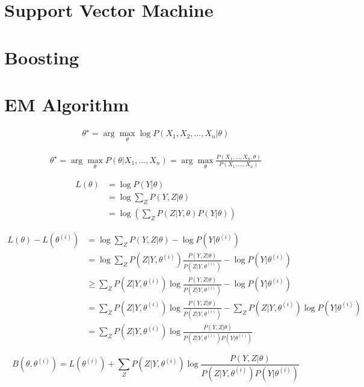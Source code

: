\documentclass[11pt]{article}
\begin{document}
\begin{CJK*}{UTF8}{gbsn}
\section{Support Vector Machine}

\section{Boosting}

\section{EM Algorithm}

\begin{align*}
	\theta^\star = \arg\max_{\theta}\log P(X_1,X_2,...,X_n|\theta)
\end{align*}

\begin{align*}
	\theta^\star = \arg\max_{\theta} P(\theta|X_1,...,X_n) = \arg\max_{\theta}\frac{P(X_1,...,X_n,\theta)}{P(X_1,...,X_n)}
\end{align*}

\begin{align*}
	L(\theta) &= \log P(Y|\theta)\\
					&= \log \sum_Z P(Y,Z|\theta)\\
					&= \log \left(\sum_Z P(Z|Y,\theta)P(Y|\theta)\right)
\end{align*}

\begin{align*}
	L(\theta) - L(\theta^{(i)}) &= \log \sum_Z P(Y,Z|\theta) - \log P(Y|\theta^{(i)})\\
		&= \log  \sum_Z P(Z|Y,\theta^{(i)}) \frac{P(Y,Z|\theta)}{P(Z|Y,\theta^{(i)})} -  \log P(Y|\theta^{(i)})\\
		&\ge \sum_Z P(Z|Y,\theta^{(i)})\log \frac{P(Y,Z|\theta)}{P(Z|Y,\theta^{(i)})} - \log P(Y|\theta^{(i)})\\
		&= \sum_Z P(Z|Y,\theta^{(i)})\log \frac{P(Y,Z|\theta)}{P(Z|Y,\theta^{(i)})} - \sum_Z  P(Z|Y,\theta^{(i)})\log P(Y|\theta^{(i)}) \\
		&= \sum_Z P(Z|Y,\theta^{(i)}) \log \frac{P(Y,Z|\theta) }{P(Z|Y,\theta^{(i)}) P(Y|\theta^{(i)})}
\end{align*}

$$B(\theta,\theta^{(i)}) = L(\theta^{(i)}) + \sum_Z P(Z|Y,\theta^{(i)}) \log \frac{P(Y,Z|\theta) }{P(Z|Y,\theta^{(i)}) P(Y|\theta^{(i)})}$$


\end{CJK*}
\end{document}

